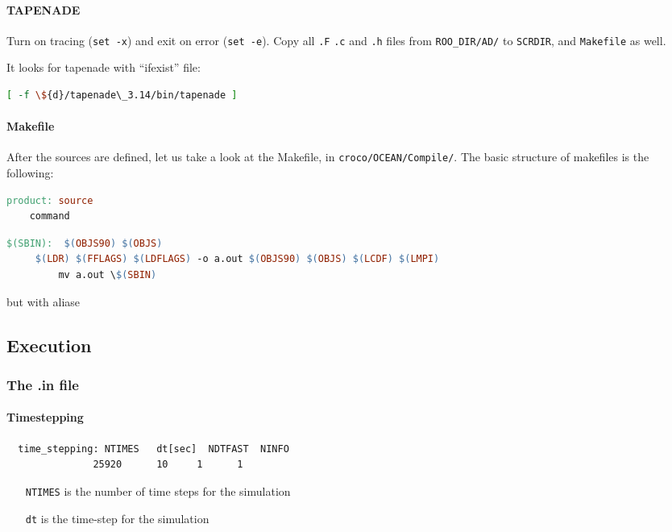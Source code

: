\documentclass{article}
\begin{document}
\paragraph{TAPENADE}
Turn on tracing (\texttt{set -x}) and exit on error (\texttt{set -e}).
Copy all \texttt{.F} \texttt{.c} and \texttt{.h} files from \texttt{ROO\_DIR/AD/} to \texttt{SCRDIR}, and \texttt{Makefile} as well.

It looks for tapenade with ``ifexist'' file:
\begin{lstlisting}[language=bash]
  [ -f \${d}/tapenade\_3.14/bin/tapenade ]
\end{lstlisting}


\paragraph{Makefile}
After the sources are defined, let us take a look at the Makefile, in  \texttt{croco/OCEAN/Compile/}.
The basic structure of makefiles is the following:
\begin{lstlisting}[language=make]
product: source
    command
  \end{lstlisting}
\begin{lstlisting}[language=make]
$(SBIN):  $(OBJS90) $(OBJS)
	 $(LDR) $(FFLAGS) $(LDFLAGS) -o a.out $(OBJS90) $(OBJS) $(LCDF) $(LMPI) 
         mv a.out \$(SBIN)
\end{lstlisting}
but with aliase
\newpage
\subsection{Execution}
\subsubsection{The .in file}
\paragraph{Timestepping}
\begin{lstlisting}
  time_stepping: NTIMES   dt[sec]  NDTFAST  NINFO
               25920      10     1      1
\end{lstlisting}
\begin{itemize}
  \item[\texttt{NTIMES}] is the number of time steps for the simulation
  \item[\texttt{dt}] is the time-step for the simulation 
\end{itemize}
\end{document}
